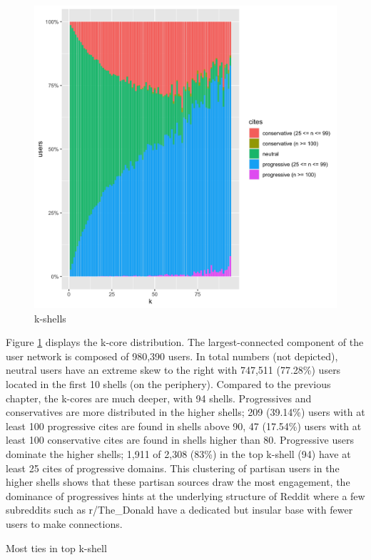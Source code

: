 \documentclass[doublespacing]{utdthesis}
\begin{document}
\begin{figure}[!ht]
\centering
\includegraphics[width=\textwidth]{2016/kshells}
\caption{k-shells}
\label{fig:kshells_2016}
\end{figure}

Figure \ref{fig:kshells_2016} displays the k-core distribution.
The largest-connected component of the user network is composed of 980,390 users.
In total numbers (not depicted), neutral users have an extreme skew to the right with 747,511 (77.28\%) users located in the first 10 shells (on the periphery).
Compared to the previous chapter, the k-cores are much deeper, with 94 shells.
Progressives and conservatives are more distributed in the higher shells; 209 (39.14\%) users with at least 100 progressive cites are found in shells above 90, 47 (17.54\%) users with at least 100 conservative cites are found in shells higher than 80.
Progressive users dominate the higher shells; 1,911 of 2,308 (83\%) in the top k-shell (94) have at least 25 cites of progressive domains.
This clustering of partisan users in the higher shells shows that these partisan sources draw the most engagement, the dominance of progressives hints at the underlying structure of Reddit where a few subreddits such as r/The\_Donald have a dedicated but insular base with fewer users to make connections.

\begin{table}[!ht]
\centering
\footnotesize
\caption{Most ties in top k-shell}

\label{tab:topk}
\end{table}
\end{document}
